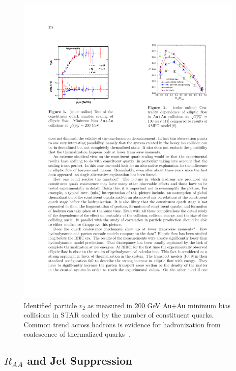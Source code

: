 \begin{figure}[htbp]
\begin{center}
\includegraphics[scale=1.7]{Plots/Intro/ncq_scale.pdf}
\end{center}
\caption[NCQ Scaling of $v_2$]{Identified particle $v_2$ as measured in 200 GeV Au+Au minimum bias collisions in STAR scaled by the number of constituent quarks. Common trend across hadrons is evidence for hadronization from coalescence of thermalized quarks~\cite{ncqscale}.}
\label{fig:ncqscale}
\end{figure}

\subsection{$R_{AA}$ and Jet Suppression}


